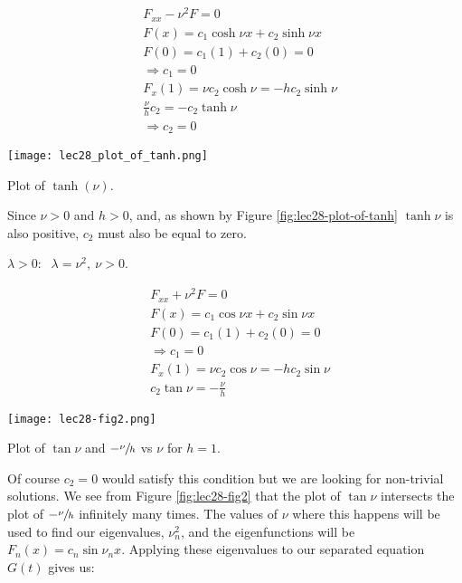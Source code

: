 \begin{align*}
&F_{xx} - \nu^2F = 0 \\
&F(x) = c_1 \cosh{\nu x} + c_2 \sinh{\nu x} \\
&F(0) = c_1(1) + c_2(0) = 0 \\
&\Rightarrow c_1 = 0 \\
&F_{x}(1) = \nu c_2 \cosh{\nu} = -h c_2 \sinh{\nu} \\
&\frac{\nu}{h}c_2 = -c_2\tanh{\nu} \\
&\Rightarrow c_2 = 0
\end{align*}
\begin{marginfigure}
\texttt{[image: lec28\_plot\_of\_tanh.png]}
\caption{Plot of $\tanh{(\nu)}$.}
\label{fig:lec28-plot-of-tanh}
\end{marginfigure}
Since $\nu>0$ and $h>0$, and, as shown by Figure \ref{fig:lec28-plot-of-tanh} $\tanh{\nu}$ is also positive, $c_2$ must also be equal to zero.

\vspace{5.0cm}

\noindent \underline{$\lambda > 0$}: $\ \ \lambda = \nu^2, \ \nu>0$.

\begin{align*}
&F_{xx} + \nu^2 F = 0  \\
&F(x) = c_1 \cos{\nu x} + c_2 \sin{\nu x} \\
&F(0) = c_1 (1) + c_2 (0) = 0 \\
&\Rightarrow c_1 = 0 \\
&F_{x}(1) = \nu c_2 \cos{\nu} = -h c_2 \sin{\nu} \\
&c_2 \tan{\nu} = -\frac{\nu}{h}
\end{align*}
\begin{marginfigure}
\texttt{[image: lec28-fig2.png]}
\caption{Plot of $\tan{\nu}$ and $-\sfrac{\nu}{h}$ vs $\nu$ for $h=1$.}
\label{fig:lec28-fig2}
\end{marginfigure}
Of course $c_2 = 0$ would satisfy this condition but we are looking for non-trivial solutions.  We see from Figure \ref{fig:lec28-fig2} that the plot of $\tan{\nu}$ intersects the plot of $-\sfrac{\nu}{h}$ infinitely many times.  The values of $\nu$ where this happens will be used to find our eigenvalues, $\nu_n^2$, and the eigenfunctions will be $F_n(x) = c_n \sin{\nu_n x}$.  Applying these eigenvalues to our separated equation $G(t)$ gives us:

